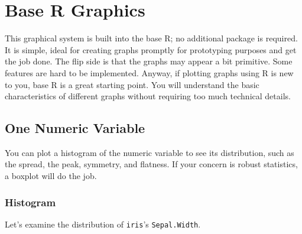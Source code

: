 \documentclass[
  letterpaper,
]{book}
\begin{document}
\section{Base R Graphics}\label{base-r-graphics}

This graphical system is built into the base R; no additional package is
required. It is simple, ideal for creating graphs promptly for
prototyping purposes and get the job done. The flip side is that the
graphs may appear a bit primitive. Some features are hard to be
implemented. Anyway, if plotting graphs using R is new to you, base R is
a great starting point. You will understand the basic characteristics of
different graphs without requiring too much technical details.

\subsection{One Numeric Variable}\label{one-numeric-variable}

You can plot a histogram of the numeric variable to see its
distribution, such as the spread, the peak, symmetry, and flatness. If
your concern is robust statistics, a boxplot will do the job.

\subsubsection{Histogram}\label{histogram}

Let's examine the distribution of \texttt{iris}'s \texttt{Sepal.Width}.
\end{document}
